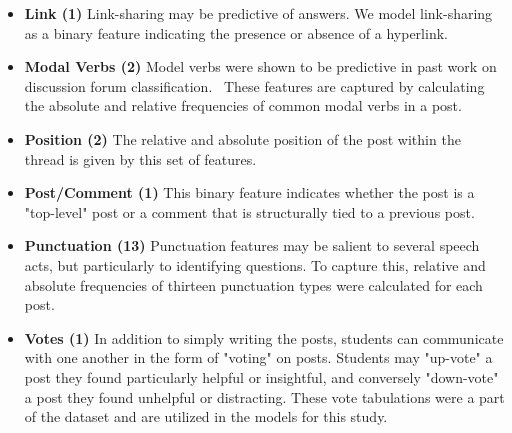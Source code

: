 \documentclass[twoside]{article}
\begin{document}
\begin{itemize}[noitemsep,nolistsep]
\item{\textbf{Link (1)} Link-sharing may be predictive of answers. We model link-sharing as a binary feature indicating the presence or absence of a hyperlink.}
\item{\textbf{Modal Verbs (2)} Model verbs were shown to be predictive in past work on discussion forum classification.~\cite{bhatia2012classifying} These features are captured by calculating the absolute and relative frequencies of common modal verbs in a post.}
\item{\textbf{Position (2)} The relative and absolute position of the post within the thread is given by this set of features.}
\item{\textbf{Post/Comment (1)} This binary feature indicates whether the post is a "top-level" post or a comment that is structurally tied to a previous post.}
\item{\textbf{Punctuation (13)} Punctuation features may be salient to several speech acts, but particularly to identifying questions. To capture this, relative and absolute frequencies of thirteen punctuation types were calculated for each post.}
\item{\textbf{Votes (1)} In addition to simply writing the posts, students can communicate with one another in the form of "voting" on posts. Students may "up-vote" a post they found particularly helpful or insightful, and conversely "down-vote" a post they found unhelpful or distracting. These vote tabulations were a part of the dataset and are utilized in the models for this study.}
\end{itemize}

\end{document}
